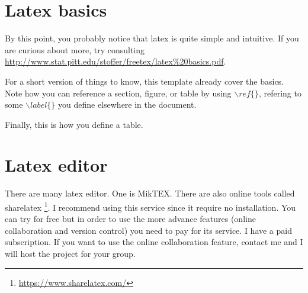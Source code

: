 \documentclass{article}
\begin{document}

\section{Latex basics} \label{sec:latex}

By this point, you probably notice that latex is quite simple and intuitive. If you are curious about more, try consulting \url{http://www.stat.pitt.edu/stoffer/freetex/latex%20basics.pdf}.

For a short version of things to know, this template already cover the basics. Note how you can reference a section, figure, or table by using $\backslash ref\{\}$, refering to some $\backslash label\{\}$ you define elsewhere in the document.

Finally, this is how you define a table.

\section{Latex editor} \label{sec:editor}

There are many latex editor. One is MikTEX. There are also online tools called sharelatex \footnote{\url{https://www.sharelatex.com/}}. I recommend using this service since it require no installation. You can try for free but in order to use the more advance features (online collaboration and version control) you need to pay for its service. I have a paid subscription. If you want to use the online collaboration feature, contact me and I will host the project for your group.
\end{document}
